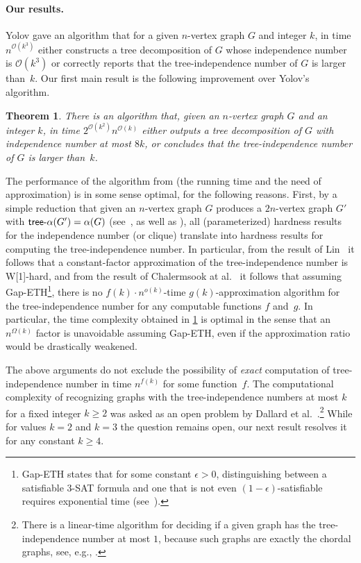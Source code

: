 \documentclass[11pt]{article}
\newtheorem{theorem}{Theorem}[section]
\theoremstyle{definition}
\newcommand{\tin}{\mathsf{tree} \textnormal{-} \alpha}
\newcommand{\OO}{\mathcal{O}}
\newcommand{\W}{\textup{\textsf{W[1]}}}
\begin{document}
\paragraph{Our results.}
Yolov \cite{Yolov18} gave an algorithm that for a given $n$-vertex graph $G$ and integer $k$, in time
$n^{\OO(k^3)}$ either constructs a tree decomposition of $G$ whose independence number is $\OO(k^3)$ or correctly reports that the tree-independence number of $G$ is larger than~$k$.
Our first main result is the following improvement over Yolov's algorithm.

\begin{theorem}
\label{the:main_alg}
There is an algorithm that, given an $n$-vertex graph $G$ and an integer $k$, in time $2^{\OO(k^2)} n^{\OO(k)}$ either outputs a tree decomposition of $G$ with independence number at most $8k$, or concludes that the tree-independence number of $G$ is larger than~$k$.
\end{theorem}

The performance of the algorithm from    (the running time and the need of approximation) is in some sense optimal, for the following reasons.
First,  by a simple reduction that given an $n$-vertex graph $G$ produces a $2n$-vertex graph $G'$ with $\tin(G') = \alpha(G)$ (see~\cite{DallardMS24}, as well as ), all (parameterized) hardness results for the independence number (or clique) translate into hardness results for computing the tree-independence number.
In particular, from the result of Lin~\cite{Lin21} it follows that a constant-factor approximation of the tree-independence number is \W-hard, and from the result of Chalermsook at al.~\cite{DBLP:journals/siamcomp/ChalermsookCKLM20} it follows that assuming Gap-ETH\footnote{Gap-ETH states that for some constant $\epsilon > 0$, distinguishing between a satisfiable 3-\textsf{SAT} formula and one that is not even $(1-\epsilon)$-satisfiable requires exponential time (see~\cite{DBLP:conf/icalp/ManurangsiR17,DBLP:journals/eccc/Dinur16}).}, there is no $f(k) \cdot n^{o(k)}$-time $g(k)$-approximation algorithm for the tree-independence number for any computable functions $f$ and~$g$.
In particular, the time complexity obtained in \cref{the:main_alg} is optimal in the sense that an $n^{\Omega(k)}$ factor is unavoidable assuming Gap-ETH, even if the approximation ratio would be drastically weakened.

The above arguments do not exclude the possibility of  \emph{exact} computation of tree-independence number in time $n^{f(k)}$ for some function~$f$.
The computational complexity  of recognizing graphs with the tree-independence numbers at most $k$ for a fixed integer $k \geq 2$ was asked as an open problem by Dallard et al.~\cite[Question~8.3]{DallardMS24}.\footnote{There is a linear-time algorithm for deciding if a given graph has the tree-independence number at most $1$, because such graphs are exactly the chordal graphs, see, e.g., \cite{Golumbic80}.}
While for values $k=2$ and $k=3$ the question remains open,  our next result resolves it for any constant $k\geq 4$.
\end{document}
